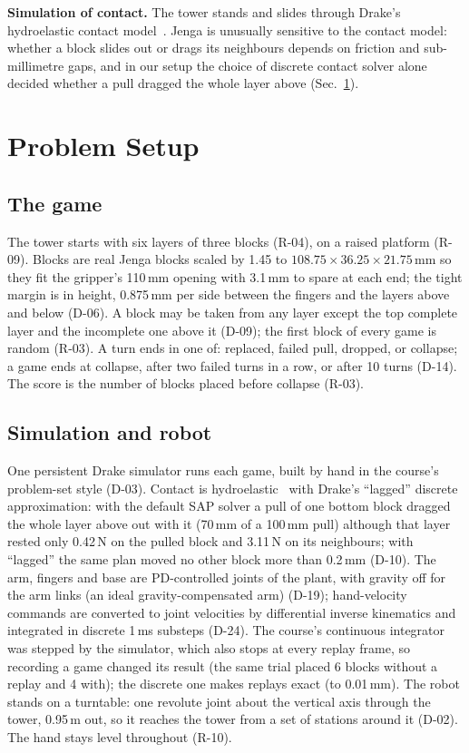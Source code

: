 \documentclass[conference]{IEEEtran}
\begin{document}
\textbf{Simulation of contact.} The tower stands and slides through Drake's~\cite{drake} hydroelastic contact
model~\cite{elandt2019}. Jenga is unusually sensitive to the contact model: whether a block slides out or drags its
neighbours depends on friction and sub-millimetre gaps, and in our setup the choice of discrete contact solver alone
decided whether a pull dragged the whole layer above (Sec.~\ref{sec:setup}).

\section{Problem Setup}\label{sec:setup}
\subsection{The game}
The tower starts with six layers of three blocks (R-04), on a raised platform (R-09). Blocks are real Jenga blocks
scaled by 1.45 to $108.75\times36.25\times21.75$\,mm so they fit the gripper's 110\,mm opening with 3.1\,mm to spare
at each end; the tight margin is in height, 0.875\,mm per side between the fingers and the layers above and below
(D-06). A block may be taken from any layer except the top complete layer and the incomplete one above it (D-09); the
first block of every game is random (R-03). A turn ends in one of: replaced, failed pull, dropped, or collapse; a game
ends at collapse, after two failed turns in a row, or after 10 turns (D-14). The score is the number of blocks placed
before collapse (R-03).

\subsection{Simulation and robot}
One persistent Drake simulator runs each game, built by hand in the course's problem-set style (D-03). Contact is
hydroelastic~\cite{elandt2019} with Drake's ``lagged'' discrete approximation: with the default SAP solver a pull of one
bottom block dragged the whole layer above out with it (70\,mm of a 100\,mm pull) although that layer rested only 0.42\,N
on the pulled block and 3.11\,N on its neighbours; with ``lagged'' the same plan moved no other block more than 0.2\,mm
(D-10). The arm, fingers and base are PD-controlled joints of the plant, with gravity
off for the arm links (an ideal gravity-compensated arm) (D-19); hand-velocity commands are converted to joint
velocities by differential inverse kinematics and integrated in discrete 1\,ms substeps (D-24). The course's continuous
integrator was stepped by the simulator, which also stops at every replay frame, so recording a game changed its result
(the same trial placed 6 blocks without a replay and 4 with); the discrete one makes replays exact (to 0.01\,mm). The robot stands on a
turntable: one revolute joint about the vertical axis through the tower, 0.95\,m out, so it reaches the tower from a
set of stations around it (D-02). The hand stays level throughout (R-10).
\end{document}
